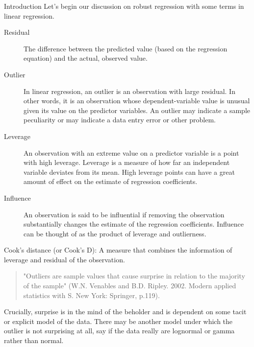 Introduction
Let's begin our discussion on robust regression with some terms in linear regression.

\begin{description}
\item[Residual] The difference between the predicted value (based on the regression equation) and the actual, observed value.

\item[Outlier] In linear regression, an outlier is an observation with large residual. In other words, it is an observation whose dependent-variable value is unusual given its value on the predictor variables. An outlier may indicate a sample peculiarity or may indicate a data entry error or other problem.

\item[Leverage] An observation with an extreme value on a predictor variable is a point with high leverage. Leverage is a measure of how far an independent variable deviates from its mean. High leverage points can have a great amount of effect on the estimate of regression coefficients.

\item[Influence] An observation is said to be influential if removing the observation substantially changes the estimate of the regression coefficients.  Influence can be thought of as the product of leverage and outlierness.

\end{description}

Cook's distance (or Cook's D): A measure that combines the information of leverage and residual of the observation.




\begin{quote}
"Outliers are sample values that cause surprise in relation to the majority of the sample" (W.N. Venables and B.D. Ripley. 2002. Modern applied statistics with S. New York: Springer, p.119).
\end{quote}

Crucially, surprise is in the mind of the beholder and is dependent on some tacit or explicit model of the data. There may be another model under which the outlier is not surprising at all, say if the data really are lognormal or gamma rather than normal.


